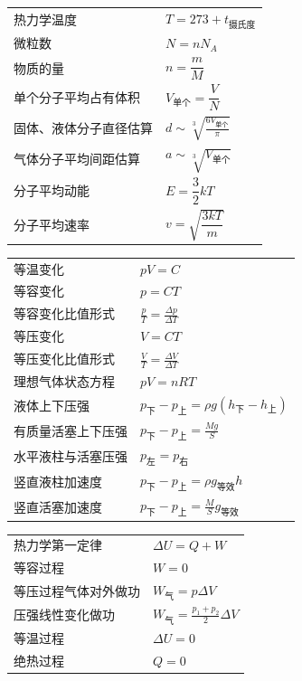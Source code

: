 \begin{tabularx}{\columnwidth}{XX}
  热力学温度 & $T=273+t_{\text{摄氏度}}$ \\
  微粒数 & $N=nN_A$ \\
  物质的量 & $n=\dfrac{m}{M}$ \\
  单个分子平均占有体积 & $V_{\text{单个}}=\dfrac{V}{N}$ \\
  固体、液体分子直径估算 & $d\sim \sqrt[3]{\frac{6V_{\text{单个}}}{\pi}}$ \\
  气体分子平均间距估算 & $a\sim \sqrt[3]{V_{\text{单个}}}$ \\
  分子平均动能 & $E=\dfrac{3}{2}kT$ \\
  分子平均速率 & $v=\sqrt{\dfrac{3kT}{m}}$ \\
\end{tabularx}
\medskip

\begin{tabularx}{\columnwidth}{XX}
  等温变化 & $pV=C$ \\
  等容变化 & $p=CT$ \\
  等容变化比值形式 & $\frac{p}{T}=\frac{\Delta p}{\Delta T}$ \\
  等压变化 & $V=CT$ \\
  等压变化比值形式 & $\frac{V}{T}=\frac{\Delta V}{\Delta T}$ \\
  理想气体状态方程 & $pV=nRT$ \\
  液体上下压强 & $p_{\text{下}}-p_{\text{上}}=\rho g(h_{\text{下}}-h_{\text{上}})$ \\
  有质量活塞上下压强 & $p_{\text{下}}-p_{\text{上}}=\frac{Mg}{S}$ \\
  水平液柱与活塞压强 & $p_{\text{左}}=p_{\text{右}}$ \\
  竖直液柱加速度 & $p_{\text{下}}-p_{\text{上}}=\rho g_{\text{等效}}h$ \\
  竖直活塞加速度 & $p_{\text{下}}-p_{\text{上}}=\frac{M}{S}g_{\text{等效}}$ \\
\end{tabularx}
\medskip

\begin{tabularx}{\columnwidth}{XX}
  热力学第一定律 & $\Delta U=Q+W$ \\
  等容过程 & $W=0$ \\
  等压过程气体对外做功 & $W_{\text{气}}=p\Delta V$ \\
  压强线性变化做功 & $W_{\text{气}}=\frac{p_1+p_2}{2}\Delta V$ \\
  等温过程 & $\Delta U=0$ \\
  绝热过程 & $Q=0$ \\
\end{tabularx}
\medskip

